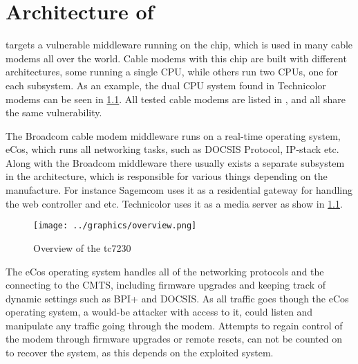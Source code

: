 \chapter{Architecture of \product}
\label{cha:architecture}
\exploitname{} targets a vulnerable middleware running on the chip, which is used in many cable modems all over the world.
Cable modems with this chip are built with different architectures, some running a single CPU, while others run two CPUs, one for each subsystem.
As an example, the dual CPU system found in Technicolor modems can be seen in \cref{fig:overview}.
All tested cable modems are listed in , and all share the same vulnerability.

The Broadcom cable modem middleware runs on a real-time operating system, eCos, which runs all networking tasks, such as DOCSIS Protocol, IP-stack etc.
Along with the Broadcom middleware there usually exists a separate subsystem in the architecture, which is responsible for various things depending on the manufacture.
For instance Sagemcom uses it as a residential gateway for handling the web controller and etc. Technicolor uses it as a media server as show in \cref{fig:overview}.

\begin{figure}[h]
  \texttt{[image: ../graphics/overview.png]}
  \caption{Overview of the tc7230}
  \label{fig:overview}
\end{figure}

The eCos operating system handles all of the networking protocols and the connecting to the CMTS, including firmware upgrades and keeping track of dynamic settings such as BPI+ and DOCSIS.
As all traffic goes though the eCos operating system, a would-be attacker with access to it, could listen and manipulate any traffic going through the modem.
Attempts to regain control of the modem through firmware upgrades or remote resets, can not be counted on to recover the system, as this depends on the exploited system.

